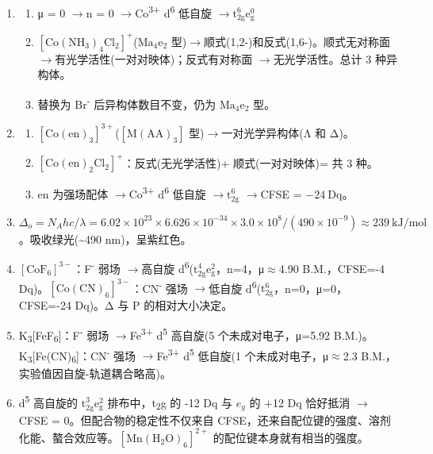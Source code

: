 \documentclass[a4paper,11pt]{ctexart}
\providecommand{\tightlist}{\setlength{\itemsep}{0pt}\setlength{\parskip}{0pt}}
\newcommand{\箭}{\ensuremath{\rightarrow}}
\newcommand{\左箭}{\ensuremath{\leftarrow}}
\newcommand{\上箭}{\ensuremath{\uparrow}}
\newcommand{\下箭}{\ensuremath{\downarrow}}
\newcommand{\衡}{\ensuremath{\rightleftharpoons}}
\newcommand{\双箭}{\ensuremath{\leftrightarrow}}
\newcommand{\约等于}{\ensuremath{\approx}}
\newcommand{\小于等于}{\ensuremath{\leq}}
\newcommand{\大于等于}{\ensuremath{\geq}}
\newcommand{\不等于}{\ensuremath{\neq}}
\newcommand{\西格马}{\ensuremath{\sigma}}
\newcommand{\派}{\ensuremath{\pi}}
\begin{document}
\begin{enumerate}
\def\labelenumi{\arabic{enumi}.}
\setcounter{enumi}{9}
\item
  \begin{enumerate}
  \def\labelenumii{(\arabic{enumii})}
  \tightlist
  \item
    μ = 0 \箭 n = 0 \箭 Co\textsuperscript{3+} d\textsuperscript{6} 低自旋 \箭 \(\mathrm{t_{2g}^6 e_g^0}\)
  \item
    \(\mathrm{[Co(NH_3)_4Cl_2]^+}\)(\(\mathrm{Ma_4e_2}\) 型)\箭 顺式(1,2-)和反式(1,6-)。顺式无对称面 \箭 有光学活性(一对对映体)；反式有对称面 \箭 无光学活性。总计 3 种异构体。
  \item
    替换为 Br\textsuperscript{-} 后异构体数目不变，仍为 \(\mathrm{Ma_4e_2}\) 型。
  \end{enumerate}
\item
  \begin{enumerate}
  \def\labelenumii{(\arabic{enumii})}
  \tightlist
  \item
    \([\mathrm{Co(en)_3}]^{3+}\)(\(\mathrm{[M(AA)_3]}\) 型)\箭 一对光学异构体(Λ 和 Δ)。
  \item
    \([\mathrm{Co(en)_2Cl_2}]^+\)：反式(无光学活性)+ 顺式(一对对映体)= 共 3 种。
  \item
    en 为强场配体 \箭 Co\textsuperscript{3+} d\textsuperscript{6} 低自旋 \箭 \(\mathrm{t_{2g}^6}\) \箭 CFSE = \(-24\ \mathrm{Dq}\)。
  \end{enumerate}
\item
  \(\Delta_o = N_A hc/\lambda = 6.02\times10^{23} \times 6.626\times10^{-34} \times 3.0\times10^8 / (490\times10^{-9}) \approx 239\ \mathrm{kJ/mol}\)。吸收绿光(\textasciitilde490 nm)，呈紫红色。
\item
  \([\mathrm{CoF_6}]^{3-}\)：F\textsuperscript{-} 弱场 \箭 高自旋 d\textsuperscript{6}(\(\mathrm{t_{2g}^4 e_g^2}\)，n=4，μ\约等于4.90 B.M.，CFSE=-4 Dq)。\([\mathrm{Co(CN)_6}]^{3-}\)：CN\textsuperscript{-} 强场 \箭 低自旋 d\textsuperscript{6}(\(\mathrm{t_{2g}^6}\)，n=0，μ=0，CFSE=-24 Dq)。Δ 与 P 的相对大小决定。
\item
  K\textsubscript{3}{[}FeF\textsubscript{6}{]}：F\textsuperscript{-} 弱场 \箭 Fe\textsuperscript{3+} d\textsuperscript{5} 高自旋(5 个未成对电子，μ=5.92 B.M.)。K\textsubscript{3}{[}Fe(CN)\textsubscript{6}{]}：CN\textsuperscript{-} 强场 \箭 Fe\textsuperscript{3+} d\textsuperscript{5} 低自旋(1 个未成对电子，μ\约等于2.3 B.M.，实验值因自旋-轨道耦合略高)。
\item
  d\textsuperscript{5} 高自旋的 \(\mathrm{t_{2g}^3 e_g^2}\) 排布中，t\textsubscript{2}g 的 -12 Dq 与 \(e_g\) 的 +12 Dq 恰好抵消 \箭 CFSE = 0。但配合物的稳定性不仅来自 CFSE，还来自配位键的强度、溶剂化能、螯合效应等。\([\mathrm{Mn(H_2O)_6}]^{2+}\) 的配位键本身就有相当的强度。
\end{enumerate}
\end{document}
